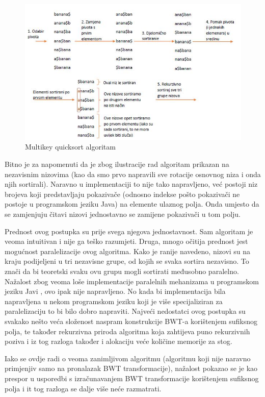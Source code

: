 \begin{figure}[h]
   \centering
       \includegraphics[width=\textwidth]{./pictures/MKQS.jpg}
 \caption{Multikey quicksort algoritam}
 \label{fig:mkqs}
\end{figure}

Bitno je za napomenuti da je zbog ilustracije rad algoritam prikazan na nezavisnim nizovima (kao da smo prvo napravili sve rotacije osnovnog niza i onda njih sortirali). Naravno u implementaciji to nije tako napravljeno, već postoji niz brojeva koji predstavljaju pokazivače (odnosno indekse pošto pokazivači ne postoje u programskom jeziku Java) na elemente ulaznog polja. Onda umjesto da se zamjenjuju čitavi nizovi jednostavno se zamijene pokazivači u tom polju.

Prednost ovog postupka su prije svega njegova jednostavnost. Sam algoritam je veoma intuitivan i nije ga teško razumjeti. Druga, mnogo očitija prednost jest mogućnost paralelizacije ovog algoritma. Kako je ranije navedeno, nizovi su na kraju podijeljeni u tri nezavisne grupe, od kojih se svaka sortira nezavisno. To znači da bi teoretski svaku ovu grupu mogli sortirati međusobno paralelno. Nažalost zbog veoma loše implementacije paralelnih mehanizama u programskom jeziku Javi , ovo ipak nije napravljeno. No kada bi implementacija bila napravljena u nekom programskom jeziku koji je više specijaliziran za paralelizaciju to bi bilo dobro napraviti. Najveći nedostatci ovog postupka su svakako nešto veća složenost naspram konstrukcije BWT-a korištenjem sufiksnog polja, te također rekurzivna priroda algoritma koja zahtijeva puno rekurzivnih poziva i iz tog razloga također i alokaciju veće količine memorije za stog.

Iako se ovdje radi o veoma zanimljivom algoritmu (algoritmu koji nije naravno primjenjiv samo na pronalazak BWT transformacije), nažalost pokazao se je kao prespor u usporedbi s izračunavanjem BWT transformacije korištenjem sufiksnog polja i it tog razloga se dalje više neće razmatrati.

